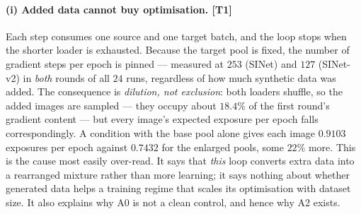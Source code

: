 \documentclass{article}
\begin{document}
\paragraph{(i) Added data cannot buy optimisation. \textnormal{[T1]}}
Each step consumes one source and one target batch, and the loop stops when the
shorter loader is exhausted. Because the target pool is fixed, the number of
gradient steps per epoch is pinned --- measured at $253$ (SINet) and $127$
(SINet-v2) in \emph{both} rounds of all $24$ runs, regardless of how much
synthetic data was added.
The consequence is \emph{dilution, not exclusion}: both loaders shuffle, so the
added images are sampled --- they occupy about $18.4\%$ of the first round's
gradient content --- but every image's expected exposure per epoch falls
correspondingly. A condition with the base pool alone gives each image $0.9103$
exposures per epoch against $0.7432$ for the enlarged pools, some $22\%$ more.
This is the cause most easily over-read. It says that \emph{this} loop converts
extra data into a rearranged mixture rather than more learning; it says nothing
about whether generated data helps a training regime that scales its
optimisation with dataset size. It also explains why A0 is not a clean control,
and hence why A2 exists.
\end{document}
